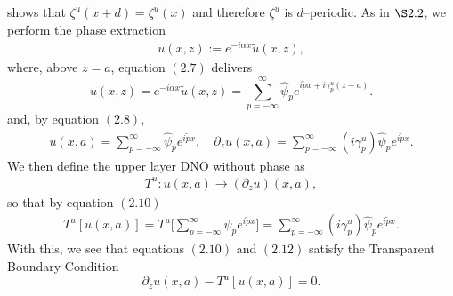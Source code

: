 shows that $\zeta^u(x+d)=\zeta^u(x)$ and therefore $\zeta^u$ is $d$--periodic. As in $\S 2.2$, we perform the phase extraction
\begin{align*}
u(x,z):=e^{-i\alpha x}\tilde{u}(x,z),
\end{align*}
where, above $z=a$, equation $(2.7)$ delivers
$$u(x,z)=e^{-i\alpha x}\tilde{u}(x,z)=\sum_{p=-\infty}^{\infty}\hat{\psi}_p e^{i\tilde{p}x+i\gamma_p^u(z-a)}.$$
and, by equation $(2.8)$,
\begin{align}
u(x,a)=\sum_{p=-\infty}^{\infty}\hat{\psi}_pe^{i\tilde{p}x},\quad
\partial_z u(x,a)=\sum_{p=-\infty}^{\infty}(i\gamma_p^u)\hat{\psi}_pe^{i\tilde{p}x}.
\end{align}
We then define the upper layer DNO without phase as
\begin{align}
T^u:u(x,a) \to \left(\partial_z u\right)(x,a),
\end{align}
so that by equation $(2.10)$
\begin{align}
T^u\left[u(x,a)\right]=T^u\Bigg[\sum_{p=-\infty}^{\infty}\hat{\psi}_pe^{i\tilde{p} x}\Bigg]=\sum_{p=-\infty}^{\infty}(i\gamma_p^u)\hat{\psi}_pe^{i\tilde{p} x}.
\end{align}
With this, we see that equations $(2.10)$ and $(2.12)$ satisfy the Transparent Boundary Condition
\begin{equation}\partial_z u(x,a)-T^u[u(x,a)]=0. \end{equation}
